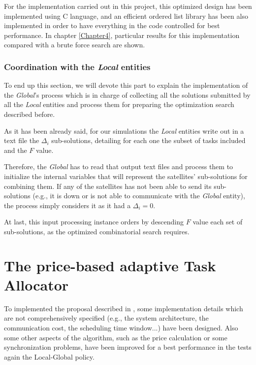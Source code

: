 For the implementation carried out in this project, this optimized design has been implemented using C language, and an efficient ordered list library has been also implemented in order to have everything in the code controlled for best performance. In chapter \ref{Chapter4}, particular results for this implementation compared with a brute force search are shown.

\subsubsection{Coordination with the \emph{Local} entities}

To end up this section, we will devote this part to explain the implementation of the \emph{Global}'s process which is in charge of collecting all the solutions submitted by all the \emph{Local} entities and process them for preparing the optimization search described before.

As it has been already said, for our simulations the \emph{Local} entities write out in a text file the $\Delta_i$ sub-solutions, detailing for each one the subset of tasks included and the $F$ value.

Therefore, the \emph{Global} has to read that output text files and process them to initialize the internal variables that will represent the satellites' sub-solutions for combining them. If any of the satellites has not been able to send its sub-solutions (e.g., it is down or is not able to communicate with the \emph{Global} entity), the process simply considers it as it had a $\Delta_i = 0$.

At last, this input processing instance orders by descending $F$ value each set of sub-solutions, as the optimized combinatorial search requires.


\section{The price-based adaptive Task Allocator}
\label{MBimplementation}

To implemented the proposal described in \cite{Edalat09}, some implementation details which are not comprehensively specified (e.g., the system architecture, the communication cost, the scheduling time window...) have been designed. Also some other aspects of the algorithm, such as the price calculation or some synchronization problems, have been improved for a best performance in the tests again the Local-Global policy.

